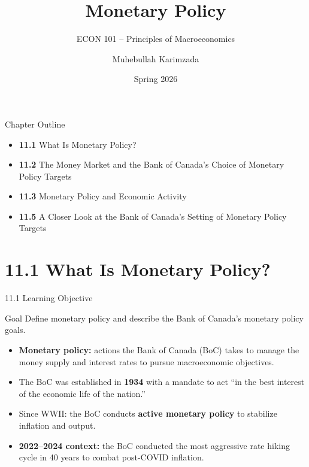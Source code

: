 \documentclass[aspectratio=169]{beamer}
\title{\textbf{Monetary Policy}}
\subtitle{{\large ECON 101 -- Principles of Macroeconomics}}
\author{Muhebullah Karimzada}
\date{Spring 2026}
\begin{document}

\begin{frame}[plain]
  \titlepage
\end{frame}

\begin{frame}{Chapter Outline}
\transfade
\begin{itemize}[<+->]
  \item \textbf{11.1} What Is Monetary Policy?
  \item \textbf{11.2} The Money Market and the Bank of Canada's Choice of Monetary Policy Targets
  \item \textbf{11.3} Monetary Policy and Economic Activity
  \item \textbf{11.5} A Closer Look at the Bank of Canada's Setting of Monetary Policy Targets
\end{itemize}
\end{frame}

\section{11.1 What Is Monetary Policy?}

\begin{frame}{11.1 Learning Objective}
\transfade
\begin{block}{Goal}
Define monetary policy and describe the Bank of Canada's monetary policy goals.
\end{block}
\begin{itemize}[<+->]
  \item \textbf{Monetary policy:} actions the Bank of Canada (BoC) takes to manage the money supply and interest rates to pursue macroeconomic objectives.
  \item The BoC was established in \textbf{1934} with a mandate to act ``in the best interest of the economic life of the nation.''
  \item Since WWII: the BoC conducts \textbf{active monetary policy} to stabilize inflation and output.
  \item \textbf{2022--2024 context:} the BoC conducted the most aggressive rate hiking cycle in 40 years to combat post-COVID inflation.
\end{itemize}
\end{frame}
\end{document}
